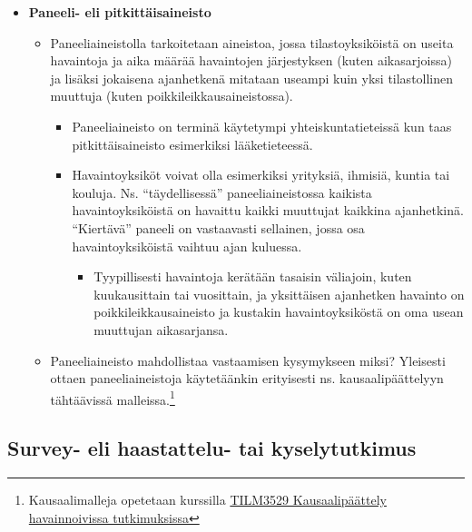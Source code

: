 \documentclass[
]{book}
\providecommand{\tightlist}{%
  \setlength{\itemsep}{0pt}\setlength{\parskip}{0pt}}
\begin{document}
\begin{itemize}
\item
  \textbf{Paneeli- eli pitkittäisaineisto}

  \begin{itemize}
  \tightlist
  \item
    Paneeliaineistolla tarkoitetaan aineistoa, jossa tilastoyksiköistä on useita havaintoja ja aika määrää havaintojen järjestyksen (kuten aikasarjoissa) ja lisäksi jokaisena ajanhetkenä mitataan useampi kuin yksi tilastollinen muuttuja (kuten poikkileikkausaineistossa).

    \begin{itemize}
    \tightlist
    \item
      Paneeliaineisto on terminä käytetympi yhteiskuntatieteissä kun taas pitkittäisaineisto esimerkiksi lääketieteessä.
    \item
      Havaintoyksiköt voivat olla esimerkiksi yrityksiä, ihmisiä, kuntia tai kouluja. Ns. ``täydellisessä'' paneeliaineistossa kaikista havaintoyksiköistä on havaittu kaikki muuttujat kaikkina ajanhetkinä. ``Kiertävä'' paneeli on vastaavasti sellainen, jossa osa havaintoyksiköistä vaihtuu ajan kuluessa.

      \begin{itemize}
      \tightlist
      \item
        Tyypillisesti havaintoja kerätään tasaisin väliajoin, kuten kuukausittain tai vuosittain, ja yksittäisen ajanhetken havainto on poikkileikkausaineisto ja kustakin havaintoyksiköstä on oma usean muuttujan aikasarjansa.
      \end{itemize}
    \end{itemize}
  \item
    Paneeliaineisto mahdollistaa vastaamisen kysymykseen miksi? Yleisesti ottaen paneeliaineistoja käytetäänkin erityisesti ns. kausaalipäättelyyn tähtäävissä malleissa.\footnote{Kausaalimalleja opetetaan kurssilla \href{https://opas.peppi.utu.fi/fi/opintojakso/TILM3529/5080}{TILM3529 Kausaalipäättely havainnoivissa tutkimuksissa}}
  \end{itemize}
\end{itemize}

\hypertarget{survey--eli-haastattelu--tai-kyselytutkimus}{%
\subsection{Survey- eli haastattelu- tai kyselytutkimus}\label{survey--eli-haastattelu--tai-kyselytutkimus}}
\end{document}
